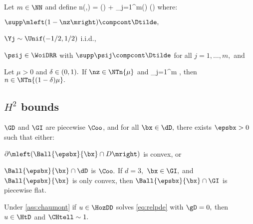 Let $m \in \NN$ and define
\beq\label{eq:nseriesml}
n(\omega,\bx) = \nz(\bx) + \sum_{j=1}^m\Yj(\omega) \psij(\bx)
\eeq
where:
\bit
\item $\supp\mleft(1-\nz\mright) \compcont \Dtilde,$
\item $\Yj \sim \Unif(-1/2,1/2)$ i.i.d.,
\item $\psij \in \WoiDRR$ with $\supp \psij \compcont \Dtilde$ for all $j = 1,\ldots,m,$ and
\eit
{}

Let $\mu > 0$ and $\delta \in \mleft(0,1\mright).$ If $\nz \in \NTn{\mu}$ and
\beq\label{eq:nseriescond}
\sum_{j=1}^m\NLiDRR{\psij(\bx) + \bx\cdot\grad\psij(\bx)} \delta\mu,
\eeq
then $n \in \NTn{(1-\delta)\mu}.$
\ele

\subsection{$H^2$ bounds}

\label{ass:chaumont}
$\GD$ and $\GI$ are piecewise $\Coo$, and for all $\bx \in \dD,$ there exists $\epsbx > 0$ such that either:
\ben
\item $\partial\mleft(\Ball{\epsbx}{\bx} \cap D\mright)$ is convex, or
\item $\Ball{\epsbx}{\bx} \cap \dD$ is $\Coo.$
  \een
    If $d=3,$ $ \bx \in \GI,$ and $\Ball{\epsbx}{\bx}$ is only convex, then $\Ball{\epsbx}{\bx} \cap \GI$ is piecewise flat.
    \eas

Under \cref{ass:chaumont} if $u \in \HozDD$ solves \eqref{eq:relpde} with $\gD=0,$ then $u \in \HtD$ and $\CHtell \sim 1.$
    \enth